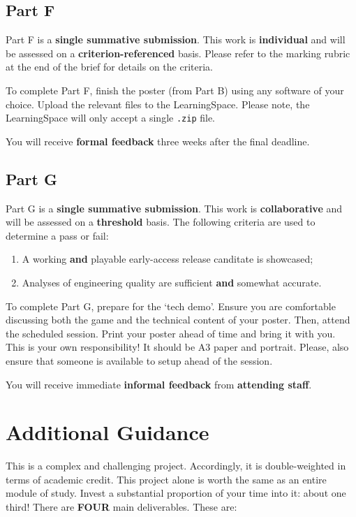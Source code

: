 \documentclass{../../fal_assignment}
\begin{document}
\subsection*{Part F}

Part F is a \textbf{single summative submission}. This work is \textbf{individual} and will be assessed on a \textbf{criterion-referenced} basis. Please refer to the marking rubric at the end of the brief for details on the criteria.

To complete Part F, finish the poster (from Part B) using any software of your choice. Upload the relevant files to the LearningSpace. Please note, the LearningSpace will only accept a single \texttt{.zip} file.

You will receive \textbf{formal feedback} three weeks after the final deadline.

\subsection*{Part G}

Part G is a \textbf{single summative submission}. This work is \textbf{collaborative} and will be assessed on a \textbf{threshold} basis. The following criteria are used to determine a pass or fail:

\begin{enumerate}[label=(\alph*)]
	\item A working \textbf{and} playable early-access release canditate is showcased;
	\item Analyses of engineering quality are sufficient \textbf{and} somewhat accurate.
\end{enumerate}

To complete Part G, prepare for the `tech demo'. Ensure you are comfortable discussing both the game and the technical content of your poster. Then, attend the scheduled session. Print your poster ahead of time and bring it with you. This is your own responsibility! It should be A3 paper and portrait. Please, also ensure that someone is available to setup ahead of the session.

You will receive immediate \textbf{informal feedback} from \textbf{attending staff}.

\section*{Additional Guidance}

This is a complex and challenging project. Accordingly, it is double-weighted in terms of academic credit. This project alone is worth the same as an entire module of study. Invest a substantial proportion of your time into it: about one third! There are \textbf{FOUR} main deliverables. These are:
\end{document}
